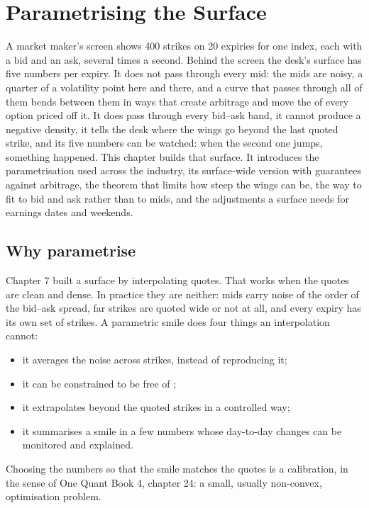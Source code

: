 \chapter{Parametrising the Surface}\label{ch:dv:parametrising-the-surface}

A market maker's screen shows 400 strikes on 20 expiries for one index, each
with a bid and an ask, several times a second. Behind the screen the desk's
surface has five numbers per expiry. It does not pass through every mid: the
mids are noisy, a quarter of a volatility point here and there, and a curve
that passes through all of them bends between them in ways that create
arbitrage and move the  of every option priced off it. It does pass
through every bid--ask band, it cannot produce a negative density, it tells the
desk where the wings go beyond the last quoted strike, and its five numbers can
be watched: when the second one jumps, something happened. This chapter builds
that surface. It introduces the parametrisation used across the industry, its
surface-wide version with guarantees against arbitrage, the theorem that limits
how steep the wings can be, the way to fit to bid and ask rather than to mids,
and the adjustments a surface needs for earnings dates and weekends.

\section{Why parametrise}

Chapter 7 built a surface by interpolating quotes. That works when the quotes are
clean and dense. In practice they are neither: mids carry noise of the order of the
bid--ask spread, far strikes are quoted wide or not at all, and every expiry has its
own set of strikes. A parametric smile does four things an interpolation cannot:
\begin{itemize}
\item it averages the noise across strikes, instead of reproducing it;
\item it can be constrained to be free of ;
\item it extrapolates beyond the quoted strikes in a controlled way;
\item it summarises a smile in a few numbers whose day-to-day changes can be monitored
and explained.
\end{itemize}
Choosing the numbers so that the smile matches the quotes is a calibration, in the
sense of One Quant Book 4, chapter 24: a small, usually non-convex, optimisation
problem.

